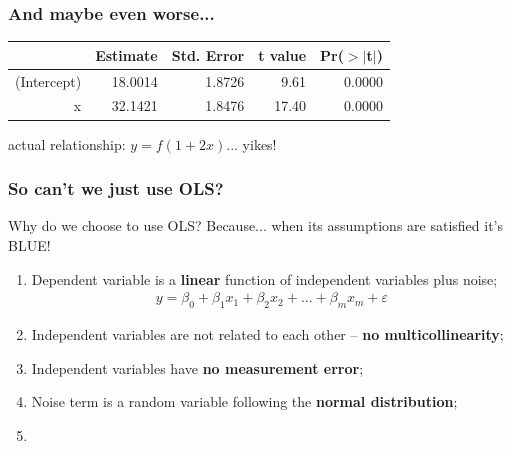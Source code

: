 \documentclass[aspectratio=169]{beamer}
\begin{document}
\begin{frame}
\frametitle{And maybe even worse...}

\begin{table}[ht]
\centering
\begin{tabular}{rrrrr}
  \hline
 & Estimate & Std. Error & t value & Pr($>$$|$t$|$) \\ 
  \hline
(Intercept) & 18.0014 & 1.8726 & 9.61 & 0.0000 \\ 
  x & 32.1421 & 1.8476 & 17.40 & 0.0000 \\ 
   \hline
\end{tabular}
\end{table}

\begin{center}\Large
actual relationship: $y = f(1 + 2x)$... yikes!
\end{center}

\end{frame}

\begin{frame}
\frametitle{So can't we just use OLS?}
Why do we choose to use OLS?  Because...  when its assumptions are satisfied it's BLUE!

\begin{enumerate}
\item Dependent variable is a \textbf{linear} function of independent variables plus noise;
\begin{align*}
y = \beta_0 + \beta_1x_1 + \beta_2x_2 + \hdots + \beta_mx_m + \varepsilon
\end{align*}

\item Independent variables are not related to each other -- \textbf{no multicollinearity};
\bigskip

\item Independent variables have \textbf{no measurement error};
\bigskip

\item Noise term is a random variable following the \textbf{normal distribution};
\bigskip

\item[]
\end{enumerate}

\end{frame}
\end{document}
